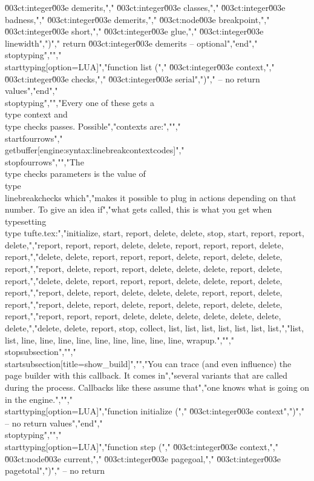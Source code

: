 \u003ct:integer\u003e demerits,","    \u003ct:integer\u003e classes,","    \u003ct:integer\u003e badness,","    \u003ct:integer\u003e demerits,","    \u003ct:node\u003e    breakpoint,","    \u003ct:integer\u003e short,","    \u003ct:integer\u003e glue,","    \u003ct:integer\u003e linewidth",")","    return \u003ct:integer\u003e demerits  -- optional","end","\\stoptyping","","\\starttyping[option=LUA]","function list (","    \u003ct:integer\u003e context,","    \u003ct:integer\u003e checks,","    \u003ct:integer\u003e serial",")","    -- no return values","end","\\stoptyping","","Every one of these gets a \\type {context} and \\type {checks} passes. Possible","contexts are:","","\\startfourrows","\\getbuffer[engine:syntax:linebreakcontextcodes]","\\stopfourrows","","The \\type {checks} parameters is the value of \\type {\\linebreakchecks} which","makes it possible to plug in actions depending on that number. To give an idea if","what gets called, this is what you get when typesetting \\type {tufte.tex}:","initialize, start, report, delete, delete, stop, start, report, report, delete,","report, report, report, delete, delete, report, report, report, delete, report,","delete, delete, report, report, report, delete, report, delete, delete, report,","report, delete, report, report, delete, delete, delete, report, delete, report,","delete, delete, report, report, report, delete, delete, report, delete, report,","report, delete, report, delete, delete, delete, report, report, delete, report,","report, delete, report, delete, report, delete, report, delete, delete, report,","report, report, report, delete, delete, delete, delete, delete, delete, delete,","delete, delete, report, stop, collect, list, list, list, list, list, list, list,","list, list, line, line, line, line, line, line, line, line, line, wrapup.","","\\stopsubsection","","\\startsubsection[title=show_build]","","You can trace (and even influence) the page builder with this callback. It comes in","several variants that are called during the process. Callbacks like these assume that","one knows what is going on in the engine.","","\\starttyping[option=LUA]","function initialize (","    \u003ct:integer\u003e context",")","    -- no return values","end","\\stoptyping","","\\starttyping[option=LUA]","function step (","    \u003ct:integer\u003e context,","    \u003ct:node\u003e    current,","    \u003ct:integer\u003e pagegoal,","    \u003ct:integer\u003e pagetotal",")","    -- no return 